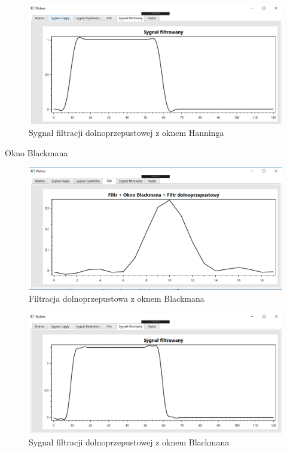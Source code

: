 \documentclass[12pt]{article}
\begin{document}
\begin{figure}[h!]
 \centering
 \includegraphics[width=12.3cm]{prostSFDHn.PNG}
 \vspace{-0.3cm}
 \caption{Sygnał filtracji dolnoprzepustowej z oknem Hanninga}
 \label{hn}
\end{figure}

\newpage
Okno Blackmana
\begin{figure}[h!]
 \centering
 \includegraphics[width=12.3cm]{prostFDOB.PNG}
 \vspace{-0.3cm}
 \caption{Filtracja dolnoprzepustowa z oknem Blackmana}
 \label{bm}
\end{figure}
\newpage
\begin{figure}[h!]
 \centering
 \includegraphics[width=12.3cm]{prostSFDB.PNG}
 \vspace{-0.3cm}
 \caption{Sygnał filtracji dolnoprzepustowej z oknem Blackmana}
 \label{sb}
\end{figure}
\end{document}
